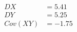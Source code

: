 \documentclass[fleqn]{article}
\begin{document}
\begin{equation}
\boxed{
    \begin{aligned}
        DX &= 5.41 \\
        DY &= 5.25 \\
        Cov(XY) &= -1.75
    \end{aligned}
}
\end{equation}
\end{document}
